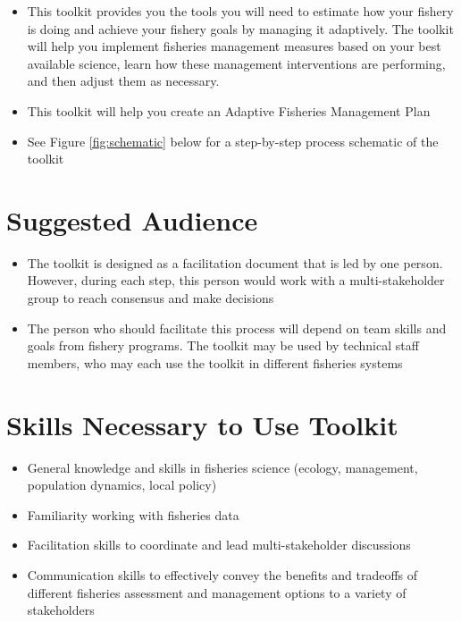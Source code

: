 \documentclass[]{book}
\begin{document}
\begin{itemize}
\item
  This toolkit provides you the tools you will need to estimate how your
  fishery is doing and achieve your fishery goals by managing it
  adaptively. The toolkit will help you implement fisheries management
  measures based on your best available science, learn how these
  management interventions are performing, and then adjust them as
  necessary.
\item
  This toolkit will help you create an Adaptive Fisheries Management
  Plan
\item
  See Figure \protect\hyperlink{fig:schematic}{\ref{fig:schematic}}
  below for a step-by-step process schematic of the toolkit
\end{itemize}

\section{Suggested Audience}\label{suggested-audience}

\begin{itemize}
\item
  The toolkit is designed as a facilitation document that is led by one
  person. However, during each step, this person would work with a
  multi-stakeholder group to reach consensus and make decisions
\item
  The person who should facilitate this process will depend on team
  skills and goals from fishery programs. The toolkit may be used by
  technical staff members, who may each use the toolkit in different
  fisheries systems
\end{itemize}

\section{Skills Necessary to Use
Toolkit}\label{skills-necessary-to-use-toolkit}

\begin{itemize}
\item
  General knowledge and skills in fisheries science (ecology,
  management, population dynamics, local policy)
\item
  Familiarity working with fisheries data
\item
  Facilitation skills to coordinate and lead multi-stakeholder
  discussions
\item
  Communication skills to effectively convey the benefits and tradeoffs
  of different fisheries assessment and management options to a variety
  of stakeholders
\end{itemize}
\end{document}
